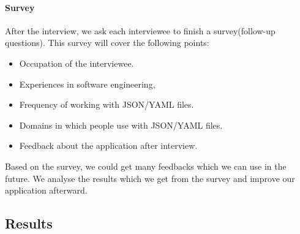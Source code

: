 \paragraph{Survey}
After the interview, we ask each interviewee to finish a survey(follow-up questions).
This survey will cover the following points:
\begin{itemize}
    \item Occupation of the interviewee.
    \item Experiences in software engineering,
    \item Frequency of working with JSON/YAML files.
    \item Domains in which people use with JSON/YAML files.
    \item Feedback about the application after interview.
\end{itemize}
Based on the survey, we could get many feedbacks which we can use in the future.
We analyse the results which we get from the survey and improve our application afterward.

\subsection{Results}

